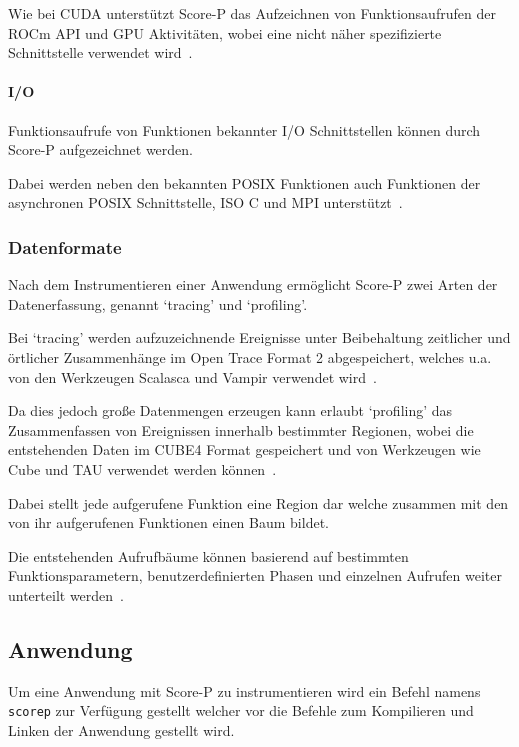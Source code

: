 \documentclass[german,proseminar,hyperref,utf8,lof]{zihpub}
\begin{document}
    Wie bei CUDA unterstützt Score-P das Aufzeichnen von Funktionsaufrufen der ROCm API und GPU Aktivitäten,
    wobei eine nicht näher spezifizierte Schnittstelle verwendet wird~.

    \paragraph{I/O}
    Funktionsaufrufe von Funktionen bekannter I/O Schnittstellen können durch Score-P aufgezeichnet werden.

    Dabei werden neben den bekannten POSIX Funktionen auch Funktionen der asynchronen POSIX Schnittstelle,
    ISO C und MPI unterstützt~.

    \subsubsection{Datenformate}
    Nach dem Instrumentieren einer Anwendung ermöglicht Score-P zwei Arten der Datenerfassung,
    genannt `tracing' und `profiling'.

    Bei `tracing' werden aufzuzeichnende Ereignisse unter Beibehaltung zeitlicher und örtlicher
    Zusammenhänge im Open Trace Format 2 abgespeichert, welches u.a. von den Werkzeugen Scalasca
    und Vampir verwendet wird~.

    Da dies jedoch gro{\ss}e Datenmengen erzeugen kann erlaubt `profiling' das Zusammenfassen von
    Ereignissen innerhalb bestimmter Regionen, wobei die entstehenden Daten im CUBE4 Format
    gespeichert und von Werkzeugen wie Cube und TAU verwendet werden
    können~.

    Dabei stellt jede aufgerufene Funktion eine Region dar welche zusammen mit den von ihr
    aufgerufenen Funktionen einen Baum bildet.

    Die entstehenden Aufrufbäume können basierend auf bestimmten Funktionsparametern,
    benutzerdefinierten Phasen und einzelnen Aufrufen weiter unterteilt
    werden~.

    \subsection{Anwendung}
    Um eine Anwendung mit Score-P zu instrumentieren wird ein Befehl namens \texttt{scorep} zur Verfügung
    gestellt welcher vor die Befehle zum Kompilieren und Linken der Anwendung gestellt wird.
\end{document}

